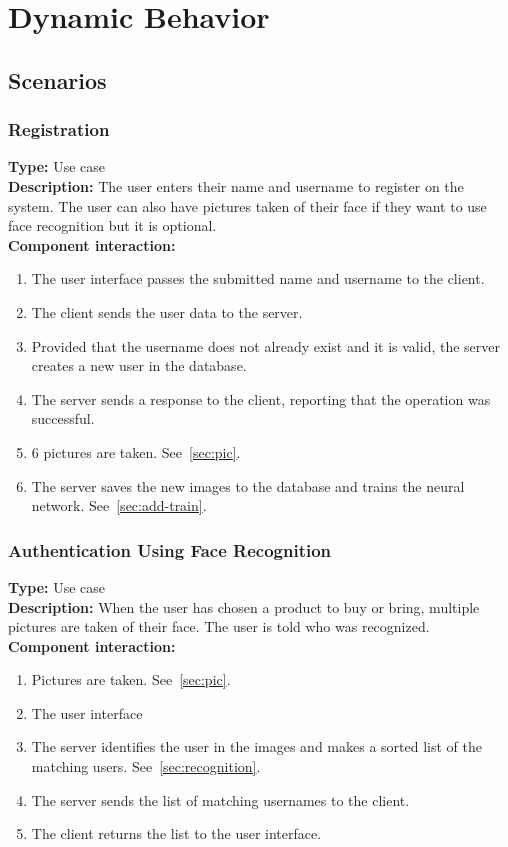 \documentclass[11pt]{article}
\begin{document}
\section{Dynamic Behavior}
\subsection{Scenarios}

\subsubsection{Registration}
\textbf{Type:} Use case\\
\textbf{Description:} The user enters their name and username to register on the system. 
The user can also have pictures taken of their face if they want to use face recognition but it is optional.\\
\textbf{Component interaction:} 
\begin{enumerate} 
\item{The user interface passes the submitted name and username to the client.}
\item{The client sends the user data to the server.}
\item{Provided that the username does not already exist and it is valid, the server creates a new user in the database.}
\item{The server sends a response to the client, reporting that the operation was successful.}
\item{6 pictures are taken. See~\ref{sec:pic}.}
\item{The server saves the new images to the database and trains the neural network. See~\ref{sec:add-train}.}
\end{enumerate}

\subsubsection{Authentication Using Face Recognition}
\textbf{Type:} Use case\\
\textbf{Description:} When the user has chosen a product to buy or bring, 
multiple pictures are taken of their face. The user is told who was recognized. \\
\textbf{Component interaction:} 
\begin{enumerate} 
\item{Pictures are taken. See~\ref{sec:pic}.}
\item{The user interface }
\item{The server identifies the user in the images and makes a sorted list of the matching users. See~\ref{sec:recognition}.}
\item{The server sends the list of matching usernames to the client.}
\item{The client returns the list to the user interface.}
\end{enumerate}
\end{document}
